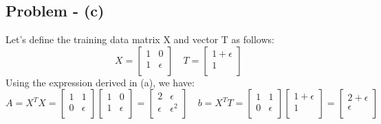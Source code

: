 \documentclass{article}
\begin{document}
\subsection{Problem - (c)}
Let's define the training data matrix X and vector T as follows:
\[
X=\begin{bmatrix}
    1 & 0 \\
    1 & \epsilon \\
\end{bmatrix}
\hspace{1em}
T=\begin{bmatrix}
    1 + \epsilon \\
    1 \\
\end{bmatrix}
\]
Using the expression derived in (a), we have:
\[
A = X^{T}X=\begin{bmatrix}
    1 & 1 \\
    0 & \epsilon \\
\end{bmatrix}
\begin{bmatrix}
    1 & 0 \\
    1 & \epsilon \\
\end{bmatrix}
=
\begin{bmatrix}
    2 & \epsilon \\
    \epsilon & \epsilon^{2} \\
\end{bmatrix}
\hspace{1em}
b = X^{T}T=
\begin{bmatrix}
    1 & 1\\
    0 & \epsilon \\
\end{bmatrix}
\begin{bmatrix}
     1 + \epsilon \\
    1 \\
\end{bmatrix}
=
\begin{bmatrix}
    2 + \epsilon\\
    \epsilon \\
\end{bmatrix}
\]
\end{document}
